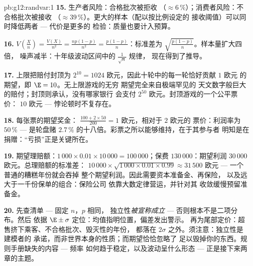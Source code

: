 \begin{solution}{pb:g12:randvar:1}
\textbf{15.} 生产者风险：合格批次被拒收
（$\approx 6\,\%$）；消费者风险：不合格批次被接收
（$\approx 39\,\%$）。更大的样本（配以按比例设定的
接收阈值）可以同时降低两者 --- 代价是更多的
检验：质量也要计入预算。

\textbf{16.} $V\!\left(\frac Xn\right) = \frac{V(X)}{n^2} =
\frac{np(1-p)}{n^2} = \frac{p(1-p)}{n}$：标准差为
$\sqrt{\frac{p(1-p)}{n}}$。样本量扩大四倍，
噪声减半：十年级波动区间中的 $\frac{1}{\sqrt n}$ 规律，
现在得到了推导。

\textbf{17.} 上限把赔付封顶为 $2^{10} = 1024$
欧元，因此十轮中的每一轮恰好贡献 $1$ 欧元
的期望，即 $\E = 10$。无上限游戏的无穷
期望完全来自极端罕见的
天文数字般巨大的赔付；封顶则承认，没有哪家银行
会支付 $2^{50}$ 欧元。封顶游戏的一个公平票价：
$10$ 欧元 --- 悖论顿时不复存在。

\textbf{18.} 每张票的期望奖金：
$\frac{100 + 2 \times 50}{200} = 1$ 欧元，相对于 $2$ 欧元的
票价：利润率为 $50\,\%$ --- 是轮盘赌
$2.7\,\%$ 的十八倍。彩票之所以能够维持，在于其参与者
明知是在捐赠：“亏损”正是关键所在。

\textbf{19.} 期望理赔额：$1\,000 \times 0.01 \times
10\,000 = 100\,000$；保费 $130\,000$：期望利润
$30\,000$ 欧元。总理赔额的标准差：
$10\,000 \times \sqrt{1\,000 \times 0.01 \times 0.99}
\approx 31\,500$ 欧元 --- 一个普通的糟糕年份就会吞掉
整个期望利润。因此需要资本准备金、再保险，
以及远大于一千份保单的组合：保险公司
依靠大数定律营运，并针对其
收敛缓慢预留准备金。

\textbf{20.} 先查清单 --- 固定 $n$，$p$ 相同，
独立性\emph{被宣称成立} --- 否则根本不是二项分布。然后
依据 $\E \pm \sigma$ 定位：均值指明位置，偏差发出警示。
再为尾部定价：超售挤下乘客、不合格批次、毁灭性的年份，
都落在 $2\sigma$ 之外。须注意：独立性是建模者的
承诺，而非世界本身的性质；而期望恰恰忽略了
足以毁掉你的东西。规则手册缺失的内容 --- 频率
如何趋于稳定，以及波动呈什么形态 ---
正是接下来两章的主题。
\end{solution}
